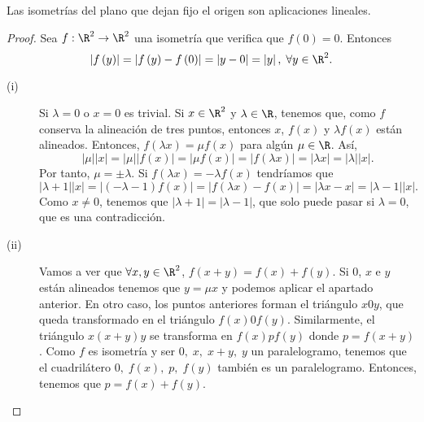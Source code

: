 \begin{fprop}[]
\normalfont Las isometrías del plano que dejan fijo el origen son aplicaciones lineales.
\end{fprop}

\begin{proof}
Sea $\displaystyle f : \R^{2} \to \R^{2} $ una isometría que verifica que $\displaystyle f\left(0\right)=0 $. Entonces
\[ \left|f\left(y\right)\right| = \left|f\left(y\right)-f\left(0\right)\right| = \left|y-0\right|= \left|y\right|, \; \forall y \in \R^{2} .\]
\begin{description}
\item[(i)] Si $\displaystyle \lambda = 0 $ o $\displaystyle x = 0 $ es trivial. Si $\displaystyle x \in \R^{2} $ y $\displaystyle \lambda \in \R $, tenemos que, como $\displaystyle f $ conserva la alineación de tres puntos, entonces $\displaystyle x $, $\displaystyle f\left(x\right) $ y $\displaystyle \lambda f\left(x\right) $ están alineados. Entonces, $\displaystyle f\left(\lambda x\right) = \mu f\left(x\right) $ para algún $\displaystyle \mu \in \R $. Así,
	\[ \left|\mu \right| \left|x\right| = \left|\mu\right| \left|f\left(x\right)\right|= \left|\mu f\left(x\right)\right| = \left|f\left(\lambda x\right)\right| = \left|\lambda x\right| = \left|\lambda \right| \left|x\right| .\]
	Por tanto, $\displaystyle \mu = \pm \lambda  $. Si $\displaystyle f\left(\lambda x \right) = -\lambda f\left(x\right) $ tendríamos que
	\[ \left|\lambda + 1\right| \left|x\right| = \left|\left(-\lambda-1\right)f\left(x\right)\right|= \left|f\left(\lambda x \right)-f\left(x\right)\right| = \left|\lambda x -x\right| = \left|\lambda-1\right| \left|x\right| .\]
	Como $\displaystyle x \neq 0 $, tenemos que $\displaystyle \left|\lambda+1\right| = \left|\lambda -1\right| $, que solo puede pasar si $\displaystyle \lambda = 0 $, que es una contradicción.
\item[(ii)] Vamos a ver que $\displaystyle \forall x,y \in \R^{2} $, $\displaystyle f\left(x+y\right) = f\left(x\right)+f\left(y\right) $. Si $\displaystyle 0 $, $\displaystyle x $ e $\displaystyle y $ están alineados tenemos que $\displaystyle y = \mu x $ y podemos aplicar el apartado anterior. En otro caso, los puntos anteriores forman el triángulo $\displaystyle x0y $, que queda transformado en el triángulo $\displaystyle f\left(x\right)0f\left(y\right) $. Similarmente, el triángulo $\displaystyle x\left(x+y\right)y $ se transforma en $\displaystyle f\left(x\right)pf\left(y\right) $ donde $\displaystyle p = f\left(x+y\right) $. Como $\displaystyle f $ es isometría y ser $\displaystyle 0, \; x, \; x+y,\;  y $ un paralelogramo, tenemos que el cuadrilátero $\displaystyle 0, \; f\left(x\right), \; p, \; f\left(y\right) $ también es un paralelogramo. Entonces, tenemos que $\displaystyle p = f\left(x\right)+f\left(y\right) $.
\end{description}
\end{proof}

